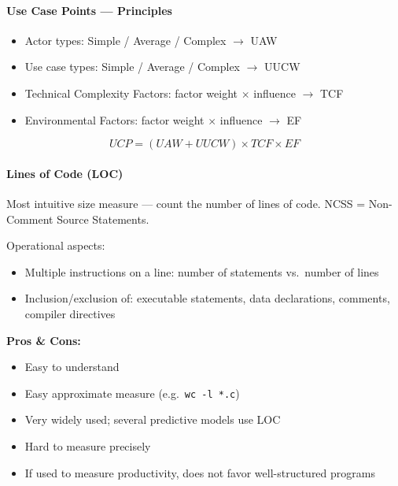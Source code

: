 \paragraph{Use Case Points — Principles}
\begin{itemize}
  \item Actor types: Simple / Average / Complex $\to$ UAW
  \item Use case types: Simple / Average / Complex $\to$ UUCW
  \item Technical Complexity Factors: factor weight $\times$ influence $\to$ TCF
  \item Environmental Factors: factor weight $\times$ influence $\to$ EF
\end{itemize}
\[
  UCP = (UAW + UUCW) \times TCF \times EF
\]

\paragraph{Lines of Code (LOC)}
Most intuitive size measure — count the number of lines of code.
NCSS = Non-Comment Source Statements.

Operational aspects:
\begin{itemize}
  \item Multiple instructions on a line: number of statements vs.\ number of lines
  \item Inclusion/exclusion of: executable statements, data declarations, comments,
        compiler directives
\end{itemize}

\textbf{Pros \& Cons:}
\begin{itemize}
  \item[$+$] Easy to understand
  \item[$+$] Easy approximate measure (e.g.\ \texttt{wc -l *.c})
  \item[$+$] Very widely used; several predictive models use LOC
  \item[$-$] Hard to measure precisely
  \item[$-$] If used to measure productivity, does not favor well-structured programs
\end{itemize}



